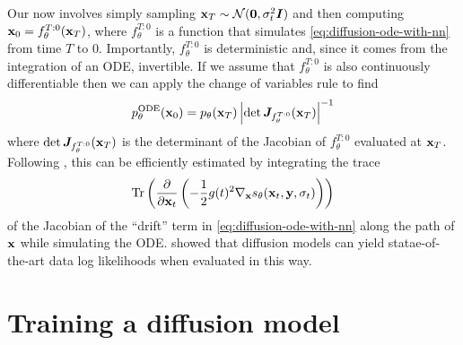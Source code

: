 Our now involves simply sampling ${\mathbf{x}}_T \sim {\mathcal{N}}({\bm{0}}, \sigma_t^2{\bm{I}})$ and then computing ${\mathbf{x}}_0 = f^{T:0}_\theta({\mathbf{x}}_T)$, where $f^{T:0}_\theta$ is a function that simulates \cref{eq:diffusion-ode-with-nn} from time $T$ to $0$. Importantly, $f^{T:0}_\theta$ is deterministic and, since it comes from the integration of an ODE, invertible. If we assume that $f^{T:0}_\theta$ is also continuously differentiable then we can apply the change of variables rule to find
\begin{equation}
    p_\theta^\text{ODE}({\mathbf{x}}_0) = p_\theta({\mathbf{x}}_T) \left| \det {\bm{J}}_{f^{T:0}_\theta}({\mathbf{x}}_T) \right|^{-1}
\end{equation}
where $\det {\bm{J}}_{f^{T:0}_\theta}({\mathbf{x}}_T)$ is the determinant of the Jacobian of $f^{T:0}_\theta$ evaluated at ${\mathbf{x}}_T$. Following \citet{chen2018neural}, this can be efficiently estimated by integrating the trace
\begin{equation}
    \text{Tr}\left( \frac{\partial}{\partial {\mathbf{x}}_t} \left( - \frac{1}{2} g(t)^2 \nabla_{\mathbf{x}} s_\theta({\mathbf{x}}_t, {\mathbf{y}}, \sigma_t) \right)
    \right)
\end{equation}
of the Jacobian of the ``drift'' term in \cref{eq:diffusion-ode-with-nn} along the path of ${\mathbf{x}}$ while simulating the ODE. \citet{song2020score} showed that diffusion models can yield statae-of-the-art data log likelihoods when evaluated in this way.




\section{Training a diffusion model} \label{sec:diffusion-training}

